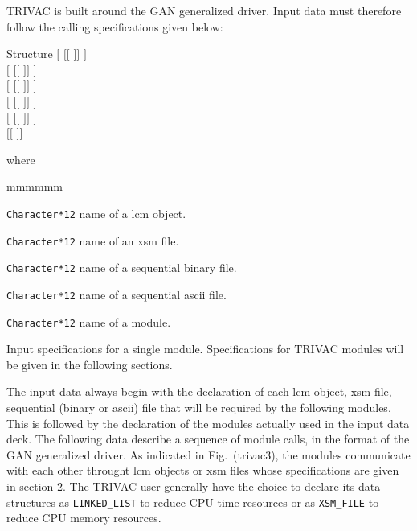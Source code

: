 TRIVAC is built around the GAN generalized driver.\cite{utilitaire} Input data must therefore follow the calling specifications given below:

\begin{DataStructure}{Structure }
$[$  $[[$  $]]$ \moc{;} $]$ \\
$[$  $[[$  $]]$ \moc{;} $]$ \\
$[$  $[[$  $]]$ \moc{;} $]$ \\
$[$  $[[$  $]]$ \moc{;} $]$ \\
$[$  $[[$  $]]$ \moc{;} $]$ \\
$[[$  $]]$ \\
\end{DataStructure}

\noindent where
\begin{ListeDeDescription}{mmmmmm}

\item[\dusa{NAME1}] {\tt Character*12} name of a {\sc lcm} object.

\item[\dusa{NAME2}] {\tt Character*12} name of an {\sc xsm} file.

\item[\dusa{NAME3}] {\tt Character*12} name of a sequential binary file.

\item[\dusa{NAME4}] {\tt Character*12} name of a sequential {\sc ascii} file.

\item[\dusa{NAME5}] {\tt Character*12} name of a module.

\item[\dstr{specif}] Input specifications for a single module. Specifications for TRIVAC modules will be given in the following sections.

\end{ListeDeDescription}

The input data always begin with the declaration of each {\sc lcm} object,   {\sc xsm}
file, sequential (binary or {\sc ascii}) file that will be required
by the following modules. This is followed by the declaration of the modules actually used in the input data deck. The following data describe a sequence of module calls, in the format of the GAN generalized driver. As indicated in Fig.~\fig(trivac3), the modules communicate with each other throught {\sc lcm} objects or {\sc xsm} files whose specifications are given in section 2. The TRIVAC user generally have the choice to declare its data structures as {\tt LINKED\_LIST} to reduce CPU time resources or as {\tt XSM\_FILE} to reduce CPU memory resources.

